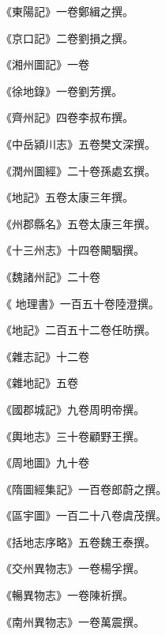 \begin{pinyinscope}
 《東陽記》一卷鄭緝之撰。



 《京口記》二卷劉損之撰。



 《湘州圖記》一卷



 《徐地錄》一卷劉芳撰。



 《齊州記》四卷李叔布撰。



 《中岳潁川志》五卷樊文深撰。



 《潤州圖經》二十卷孫處玄撰。



 《地記》五卷太康三年撰。



 《州郡縣名》五卷太康三年撰。



 《十三州志》十四卷闞駰撰。



 《魏諸州記》二十卷



 《
 地理書》一百五十卷陸澄撰。



 《地記》二百五十二卷任昉撰。



 《雜志記》十二卷



 《雜地記》五卷



 《國郡城記》九卷周明帝撰。



 《輿地志》三十卷顧野王撰。



 《周地圖》九十卷



 《隋圖經集記》一百卷郎蔚之撰。



 《區宇圖》一百二十八卷虞茂撰。



 《括地志序略》五卷魏王泰撰。



 《交州異物志》一卷楊孚撰。



 《暢異物志》一卷陳祈撰。



 《南州異物志》一卷萬震撰。




\end{pinyinscope}
